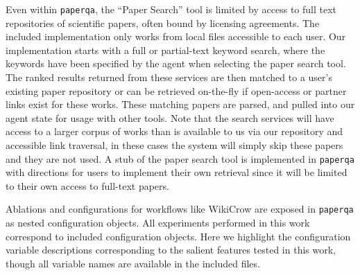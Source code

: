 Even within \texttt{paperqa}, the ``Paper Search'' tool is limited by access to full text repositories of scientific papers, often bound by licensing agreements. The included implementation only works from local files accessible to each user. Our implementation starts with a full or partial-text keyword search, where the keywords have been specified by the agent when selecting the paper search tool. The ranked results returned from these services are then matched to a user's existing paper repository or can be retrieved on-the-fly if open-access or partner links exist for these works. These matching papers are parsed, and pulled into our agent state for usage with other tools. Note that the search services will have access to a larger corpus of works than is available to us via our repository and accessible link traversal, in these cases the system will simply skip these papers and they are not used. A stub of the paper search tool is implemented in \texttt{paperqa} with directions for users to implement their own retrieval since it will be limited to their own access to full-text papers. 

Ablations and configurations for workflows like WikiCrow are exposed in \texttt{paperqa} as nested configuration objects. All experiments performed in this work correspond to included configuration objects. Here we highlight the configuration variable descriptions corresponding to the salient features tested in this work, though all variable names are available in the included files. 

